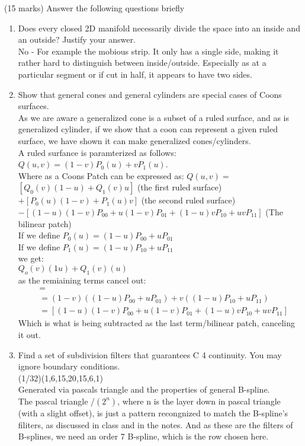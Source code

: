 (15 marks) Answer the following questions briefly
\begin{enumerate}
\item Does every closed 2D manifold necessarily divide the space into an inside and an outside? Justify your answer. \\
No - For example the mobious strip. It only has a single side, making it rather hard to distinguish between inside/outside. Especially as at a particular segment or if cut in half, it appears to have two sides.\\

\item Show that general cones and general cylinders are special cases of Coons surfaces. \\
As we are aware a generalized cone is a subset of a ruled surface, and as is generalized cylinder, if we show that a coon can represent a given ruled surface, we have shown it can make generalized cones/cylinders. \\

A ruled surfance is paramterized as follows: $Q(u,v) = (1 - v)P_0(u) + vP_1(u)$. \\
Where as a Coons Patch can be expressed as: $Q(u, v) =$ \\
$[Q_0 (v)(1 - u) + Q_1 (v)u]$ (the first ruled surface) \\
$+ [P_0 (u)(1 - v) + P_1 (u)v]$ (the second ruled surface) \\
$- [(1 - u)(1 - v)P_{00} + u(1 - v)P_{01} + (1 - u)vP_{10} + uvP_{11} ]$ (The bilinear patch) \\

If we define $P_0(u) = (1-u)P_{00} + uP_{01}$ \\
If we define $P_1(u) = (1-u)P_{10} + uP_{11}$ \\
we get: \\
$Q_o(v)(1u) + Q_1(v)(u)$ \\
as the remiaining terms cancel out:
\begin{align*}
[P_0 (u)(1 - v) + P_1 (u)v] &= \\
&= (1-v)((1-u)P_{00} + uP_{01}) + v((1-u)P_{10} + uP_{11}) \\
&= [(1 - u)(1 - v)P_{00} + u(1 - v)P_{01} + (1 - u)vP_{10} + uvP_{11} ]
\end{align*}
Which is what is being subtracted as the last term/bilinear patch, canceling it out.

\item Find a set of subdivision filters that guarantees C 4 continuity. You may ignore boundary
conditions. \\
(1/32)(1,6,15,20,15,6,1) \\
Generated via pascals triangle and the properties of general B-spline. \\
The pascal triangle /$(2^n)$, where n is the layer down in pascal triangle (with a slight offset), is just a pattern recongnized to match the B-spline's filiters, as discussed in class and in the notes. And as these are the filters of B-splines, we need an order 7 B-spline, which is the row chosen here.
\end{enumerate}
